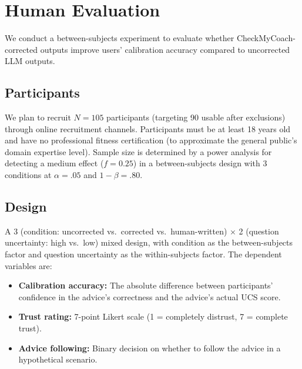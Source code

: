 \documentclass[manuscript, review, anonymous]{acmart}
\begin{document}
\section{Human Evaluation}
\label{sec:evaluation}


We conduct a between-subjects experiment to evaluate whether CheckMyCoach-corrected outputs improve users' calibration accuracy compared to uncorrected LLM outputs.

\subsection{Participants}

We plan to recruit $N = 105$ participants (targeting 90 usable after exclusions) through online recruitment channels. Participants must be at least 18 years old and have no professional fitness certification (to approximate the general public's domain expertise level). Sample size is determined by a power analysis for detecting a medium effect ($f = 0.25$) in a between-subjects design with 3 conditions at $\alpha = .05$ and $1-\beta = .80$.

\subsection{Design}

A 3 (condition: uncorrected vs.~corrected vs.~human-written) $\times$ 2 (question uncertainty: high vs.~low) mixed design, with condition as the between-subjects factor and question uncertainty as the within-subjects factor. The dependent variables are:

\begin{itemize}
    \item \textbf{Calibration accuracy:} The absolute difference between participants' confidence in the advice's correctness and the advice's actual UCS score.
    \item \textbf{Trust rating:} 7-point Likert scale (1 = completely distrust, 7 = complete trust).
    \item \textbf{Advice following:} Binary decision on whether to follow the advice in a hypothetical scenario.
\end{itemize}
\end{document}
